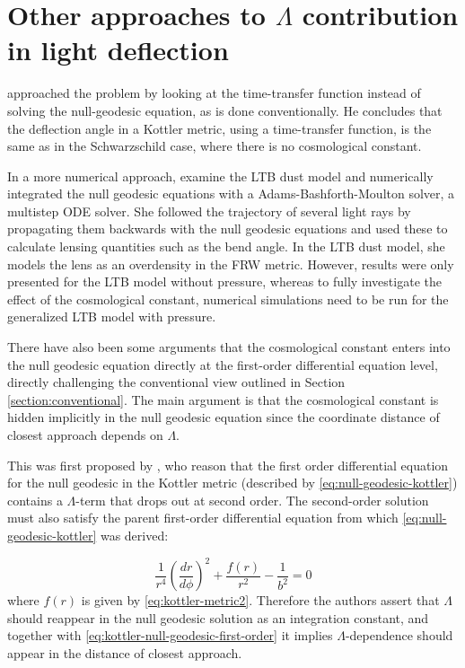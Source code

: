 \section{Other approaches to $\Lambda$ contribution in light deflection}\label{section:other}

\citet{Arakida2016} approached the problem by looking at the time-transfer function \citep{LePoncin-Lafitte2004} instead of solving the null-geodesic equation, as is done conventionally. He concludes that the deflection angle in a Kottler metric, using a time-transfer function, is the same as in the Schwarzschild case, where there is no cosmological constant. 

In a more numerical approach, \citet{beyon2012} examine the LTB dust model \citep{1997GReGr..29..641L,1934PNAS...20..169T,1947MNRAS.107..410B} and numerically integrated the null geodesic equations with a Adams-Bashforth-Moulton solver, a multistep ODE solver. She followed the trajectory of several light rays by propagating them backwards with the null geodesic equations and used these to calculate lensing quantities such as the bend angle. In the LTB dust model, she models the lens as an overdensity in the FRW metric. However, results were only presented for the LTB model without pressure, whereas to fully investigate the effect of the cosmological constant, numerical simulations need to be run for the generalized LTB model with pressure. 

There have also been some arguments that the cosmological constant enters into the null geodesic equation directly at the first-order differential equation level, directly challenging the conventional view outlined in Section \ref{section:conventional}. The main argument is that the cosmological constant is hidden implicitly in the null geodesic equation since the coordinate distance of closest approach depends on $\Lambda$. 

This was first proposed by \citet{Bhadra2010}, who reason that the first order differential equation for the null geodesic in the Kottler metric (described by \eqref{eq:null-geodesic-kottler}) contains a $\Lambda$-term that drops out at second order. The second-order solution must also satisfy the parent first-order differential equation from which \eqref{eq:null-geodesic-kottler} was derived:

\begin{equation}
  \frac{1}{r^4} \left ( \frac{dr}{d\phi} \right )^2 + \frac{f(r)}{r^2} - \frac{1}{b^2} = 0
  \label{eq:kottler-null-geodesic-first-order}
\end{equation}
where $f(r)$ is given by \eqref{eq:kottler-metric2}. Therefore the authors assert that $\Lambda$ should reappear in the null geodesic solution as an integration constant, and together with \eqref{eq:kottler-null-geodesic-first-order} it implies $\Lambda$-dependence should appear in the distance of closest approach. 

